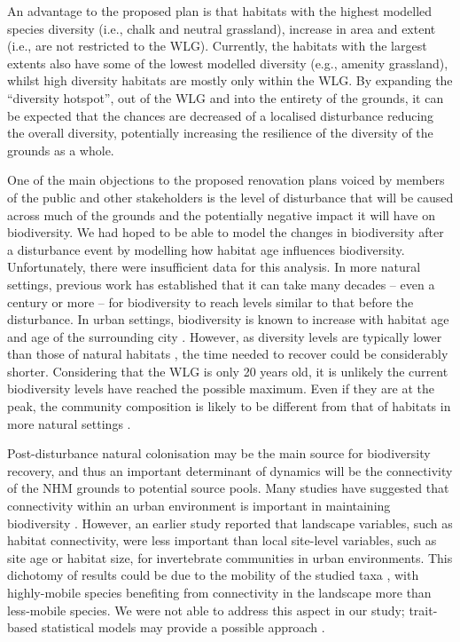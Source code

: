 An advantage to the proposed plan is that habitats with the highest modelled species diversity (i.e., chalk and neutral grassland), increase in area and extent (i.e., are not restricted to the WLG). Currently, the habitats with the largest extents also have some of the lowest modelled diversity (e.g., amenity grassland), whilst high diversity habitats are mostly only within the WLG. By expanding the ``diversity hotspot'', out of the WLG and into the entirety of the grounds, it can be expected that the chances are decreased of a localised disturbance reducing the overall diversity, potentially increasing the resilience of the diversity of the grounds as a whole.


One of the main objections to the proposed renovation plans voiced by members of the public and other stakeholders is the level of disturbance that will be caused across much of the grounds and the potentially negative impact it will have on biodiversity. We had hoped to be able to model the changes in biodiversity after a disturbance event by modelling how habitat age influences biodiversity. Unfortunately, there were insufficient data for this analysis. In more natural settings, previous work has established that it can take many decades \citep{Hirst:2005jae} -- even a century or more \citep{Vellend:2006ecol} -- for biodiversity to reach levels similar to that before the disturbance. In urban settings, biodiversity is known to increase with habitat age \citep{Yamaguchi:2004er,Sattler:2010le} and age of the surrounding city \citep{Aronson:2014procb}. However, as diversity levels are typically lower than those of natural habitats \citep{Bates:2011po,Ockinger:2009lup}, the time needed to recover could be considerably shorter. Considering that the WLG is only 20 years old, it is unlikely the current biodiversity levels have reached the possible maximum. Even if they are at the peak, the community composition is likely to be different from that of habitats in more natural settings \citep{Angold:2006ste}. 

Post-disturbance natural colonisation may be the main source for biodiversity recovery, and thus an important determinant of dynamics will be the connectivity of the NHM grounds to potential source pools. Many studies have suggested that connectivity within an urban environment is important in maintaining biodiversity \citep{Ockinger:2009lup,Goddard:2010tree,Kong:2010lup,Vergnes:2012bc}. However, an earlier study \citep{Angold:2006ste} reported that landscape variables, such as habitat connectivity, were less important than local site-level variables, such as site age or habitat size, for invertebrate communities in urban environments. This dichotomy of results could be due to the mobility of the studied taxa \citep{Braaker:2014ec}, with highly-mobile species benefiting from connectivity in the landscape more than less-mobile species. We were not able to address this aspect in our study; trait-based statistical models may provide a possible approach \citep[e.g.,][]{Ockinger:2010el,Lizee:2011ei}.

